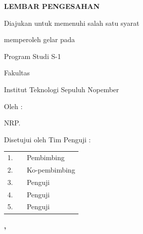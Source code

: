 \begin{center}
  \textbf{LEMBAR PENGESAHAN}\par
  \vspace{\baselineskip}
  \vspace{\baselineskip}
  \ifdefined\approvaltitlelabel
    \textbf{\approvaltitlelabel}\par
  \fi
  \textbf{\MakeUppercase{\tatitle{}}}\par
  \vspace{\baselineskip}
  \textbf{\doctypename{}}\par
  Diajukan untuk memenuhi salah satu syarat\par
  memperoleh gelar \degree{} pada\par
  Program Studi S-1 \studyprogram{}\par
  Fakultas \faculty{}\par
  Institut Teknologi Sepuluh Nopember\par
  \vspace{\baselineskip}
  Oleh : \textbf{\MakeUppercase{\name{}}}\par
  NRP. \nrp{}\par
  \vspace{\baselineskip}
  Disetujui oleh Tim Penguji \doctypename{}:
\end{center}

\begingroup
\renewcommand{\arraystretch}{2.2}
\noindent
\begin{tabularx}{\textwidth}{@{}r X p{}@{}}
  1. & \advisor{}    & Pembimbing \\
  2. & \coadvisor{}  & Ko-pembimbing \\
  3. & \examinerone{} & Penguji \\
  4. & \examinertwo{} & Penguji \\
  5. & \examinerthree{} & Penguji
\end{tabularx}
\endgroup

\vspace{\baselineskip}

\begin{center}
  \textbf{\MakeUppercase{\place{}}}\par
  \textbf{\MONTH{}, \the\year{}}
\end{center}
